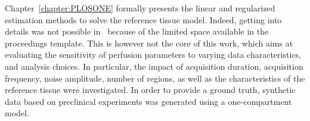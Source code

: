 Chapter~\ref{chapter:PLOSONE} formally presents the linear and regularized estimation methods to solve the reference tissue model.
Indeed, getting into details was not possible in~\cite{Doury2017wn} because of the limited space available in the proceedings template.
This is however not the core of this work, which aims at evaluating the sensitivity of perfusion parameters to varying data characteristics, and analysis choices.
In particular, the impact of acquisition duration, acquisition frequency, noise amplitude, number of regions, as well as the characteristics of the reference tissue were investigated.
In order to provide a ground truth, synthetic data based on preclinical experiments was generated using a one-compartment model.
